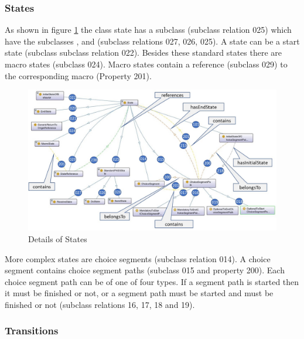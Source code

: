 \subsubsection{States}

As shown in figure \ref{fig:20190109-states} the class state has a subclass  (subclass relation 025) which have the subclasses ,  and (subclass relations 027, 026, 025). A state can be a start state (subclass  subclass relation 022). Besides these standard states there are macro states (subclass 024). Macro states contain a reference (subclass 029) to the corresponding macro (Property 201).

\begin{figure}[htbp]
	\centering
	\includegraphics[width=1.0\linewidth]{Figures/Ontology/SubjectBehavior/20190109-States}
	\caption[Details of States]{Details of States}
	\label{fig:20190109-states}
\end{figure}

More complex states are choice segments (subclass relation 014). A choice segment contains choice segment paths (subclass 015 and property 200). Each choice segment path can be of one of four types. If a segment path is started then it must be finished or not, or a segment path must be started and must be finished or not (subclass relations 16, 17, 18 and 19).

\subsubsection{Transitions}

